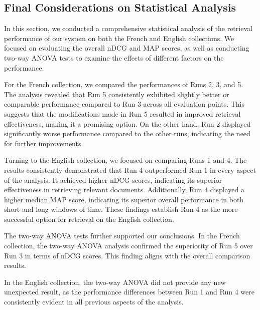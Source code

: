 \newpage
\enlargethispage{4\baselineskip}
\subsection{Final Considerations on Statistical Analysis}

In this section, we conducted a comprehensive statistical analysis of the retrieval performance of our system on both the French and English collections. 
We focused on evaluating the overall \ac{nDCG} and \ac{MAP} scores, as well as conducting two-way \ac{ANOVA} tests to examine the effects of different factors on the performance.

For the French collection, we compared the performances of Runs 2, 3, and 5. 
The analysis revealed that Run 5 consistently exhibited slightly better or comparable performance compared to Run 3 across all evaluation points. 
This suggests that the modifications made in Run 5 resulted in improved retrieval effectiveness, making it a promising option. 
On the other hand, Run 2 displayed significantly worse performance compared to the other runs, indicating the need for further improvements.

Turning to the English collection, we focused on comparing Runs 1 and 4. 
The results consistently demonstrated that Run 4 outperformed Run 1 in every aspect of the analysis. 
It achieved higher \ac{nDCG} scores, indicating its superior effectiveness in retrieving relevant documents. 
Additionally, Run 4 displayed a higher median \ac{MAP} score, indicating its superior overall performance in both short and long windows of time. 
These findings establish Run 4 as the more successful option for retrieval on the English collection.

The two-way \ac{ANOVA} tests further supported our conclusions. 
In the French collection, the two-way \ac{ANOVA} analysis confirmed the superiority of Run 5 over Run 3 in terms of \ac{nDCG} scores. 
This finding aligns with the overall comparison results. 

In the English collection, the two-way \ac{ANOVA} did not provide any new unexpected result, as the performance differences between Run 1 and Run 4 were consistently evident in all previous aspects of the analysis.

